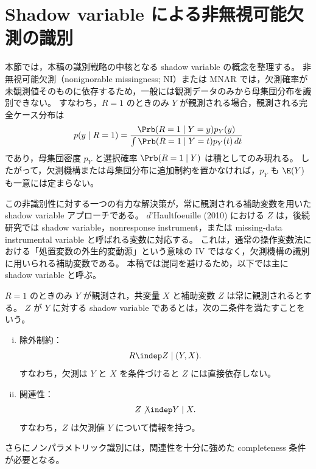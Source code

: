 

\section{Shadow variable による非無視可能欠測の識別}
\label{sec:shadow-variable-review}

本節では，本稿の識別戦略の中核となる shadow variable の概念を整理する。
非無視可能欠測（nonignorable missingness; NI）または MNAR では，欠測確率が未観測値そのものに依存するため，一般には観測データのみから母集団分布を識別できない。
すなわち，$R=1$ のときのみ $Y$ が観測される場合，観測される完全ケース分布は
\begin{equation}
  p(y\mid R=1)
  =
  \frac{\Prb(R=1\mid Y=y)p_Y(y)}
       {\int \Prb(R=1\mid Y=t)p_Y(t)\,dt}
  \label{eq:cc-density-shadow-section}
\end{equation}
であり，母集団密度 $p_Y$ と選択確率 $\Prb(R=1\mid Y)$ は積としてのみ現れる。
したがって，欠測機構または母集団分布に追加制約を置かなければ，$p_Y$ も $\E(Y)$ も一意には定まらない。

この非識別性に対する一つの有力な解決策が，常に観測される補助変数を用いた shadow variable アプローチである。
$d$'Haultfoeuille (2010) における $Z$ は，後続研究では shadow variable，nonresponse instrument，または missing-data instrumental variable と呼ばれる変数に対応する。
これは，通常の操作変数法における「処置変数の外生的変動源」という意味の IV ではなく，欠測機構の識別に用いられる補助変数である。
本稿では混同を避けるため，以下では主に shadow variable と呼ぶ。

\begin{definition}
\label{def:shadow-variable}
$R=1$ のときのみ $Y$ が観測され，共変量 $X$ と補助変数 $Z$ は常に観測されるとする。
$Z$ が $Y$ に対する shadow variable であるとは，次の二条件を満たすことをいう。
\begin{enumerate}[(i)]
  \item 除外制約：
  \begin{equation}
    R \indep Z \mid (Y,X).
    \label{eq:shadow-exclusion}
  \end{equation}
  すなわち，欠測は $Y$ と $X$ を条件づけると $Z$ には直接依存しない。
  \item 関連性：
  \begin{equation}
    Z \not\indep Y \mid X.
    \label{eq:shadow-relevance}
  \end{equation}
  すなわち，$Z$ は欠測値 $Y$ について情報を持つ。
\end{enumerate}
さらにノンパラメトリック識別には，関連性を十分に強めた completeness 条件が必要となる。
\end{definition}

